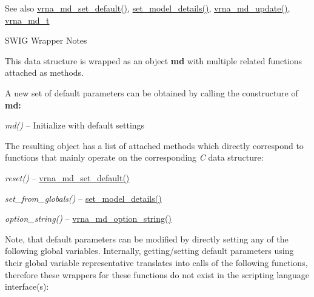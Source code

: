 \begin{DoxySeeAlso}{See also}
\mbox{\hyperlink{group__model__details_ga8ac6ff84936282436f822644bf841f66}{vrna\+\_\+md\+\_\+set\+\_\+default()}}, \mbox{\hyperlink{group__model__details_gabad896c3650d420f3f3ddefc69e2bceb}{set\+\_\+model\+\_\+details()}}, \mbox{\hyperlink{group__model__details_ga36ae40b8c3b82362f5798ad5b047b814}{vrna\+\_\+md\+\_\+update()}}, \mbox{\hyperlink{group__model__details_ga1f8a10e12a0a1915f2a4eff0b28ea17c}{vrna\+\_\+md\+\_\+t}}
\end{DoxySeeAlso}
\begin{DoxyRefDesc}{S\+W\+I\+G Wrapper Notes}
\item[\mbox{\hyperlink{wrappers__wrappers000042}{S\+W\+I\+G Wrapper Notes}}]This data structure is wrapped as an object {\bfseries md} with multiple related functions attached as methods.

A new set of default parameters can be obtained by calling the constructure of {\bfseries md\+:} ~\newline

\begin{DoxyItemize}
\item {\itshape md()} -- Initialize with default settings
\end{DoxyItemize}

The resulting object has a list of attached methods which directly correspond to functions that mainly operate on the corresponding {\itshape C} data structure\+:~\newline

\begin{DoxyItemize}
\item {\itshape reset()} -- \mbox{\hyperlink{group__model__details_ga8ac6ff84936282436f822644bf841f66}{vrna\+\_\+md\+\_\+set\+\_\+default()}}
\item {\itshape set\+\_\+from\+\_\+globals()} -- \mbox{\hyperlink{group__model__details_gabad896c3650d420f3f3ddefc69e2bceb}{set\+\_\+model\+\_\+details()}}
\item {\itshape option\+\_\+string()} -- \mbox{\hyperlink{group__model__details_ga3a7469f0725a849af6ba61a57dfd60ce}{vrna\+\_\+md\+\_\+option\+\_\+string()}}
\end{DoxyItemize}

Note, that default parameters can be modified by directly setting any of the following global variables. Internally, getting/setting default parameters using their global variable representative translates into calls of the following functions, therefore these wrappers for these functions do not exist in the scripting language interface(s)\+:


\end{DoxyRefDesc}
